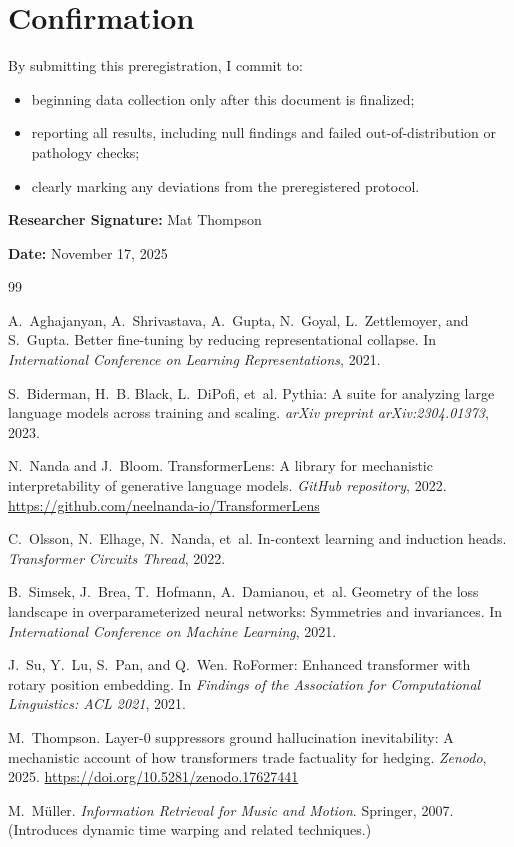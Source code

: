 \documentclass[11pt]{article}
\begin{document}
\section{Confirmation}

By submitting this preregistration, I commit to:
\begin{itemize}
  \item beginning data collection only after this document is finalized;
  \item reporting all results, including null findings and failed out-of-distribution or pathology checks;
  \item clearly marking any deviations from the preregistered protocol.
\end{itemize}

\bigskip

\noindent\textbf{Researcher Signature:} Mat Thompson

\noindent\textbf{Date:} November 17, 2025

\begin{thebibliography}{99}

A.~Aghajanyan, A.~Shrivastava, A.~Gupta, N.~Goyal, L.~Zettlemoyer, and S.~Gupta.
\newblock Better fine-tuning by reducing representational collapse.
\newblock In \emph{International Conference on Learning Representations}, 2021.

S.~Biderman, H.~B. Black, L.~DiPofi, et~al.
\newblock Pythia: A suite for analyzing large language models across training and scaling.
\newblock \emph{arXiv preprint arXiv:2304.01373}, 2023.

N.~Nanda and J.~Bloom.
\newblock TransformerLens: A library for mechanistic interpretability of generative language models.
\newblock \emph{GitHub repository}, 2022. \url{https://github.com/neelnanda-io/TransformerLens}

C.~Olsson, N.~Elhage, N.~Nanda, et~al.
\newblock In-context learning and induction heads.
\newblock \emph{Transformer Circuits Thread}, 2022.

B.~Simsek, J.~Brea, T.~Hofmann, A.~Damianou, et~al.
\newblock Geometry of the loss landscape in overparameterized neural networks: Symmetries and invariances.
\newblock In \emph{International Conference on Machine Learning}, 2021.

J.~Su, Y.~Lu, S.~Pan, and Q.~Wen.
\newblock RoFormer: Enhanced transformer with rotary position embedding.
\newblock In \emph{Findings of the Association for Computational Linguistics: ACL 2021}, 2021.

M.~Thompson.
\newblock Layer-0 suppressors ground hallucination inevitability: A mechanistic account of how transformers trade factuality for hedging.
\newblock \emph{Zenodo}, 2025. \url{https://doi.org/10.5281/zenodo.17627441}

M.~M{\"u}ller.
\newblock \emph{Information Retrieval for Music and Motion}.
\newblock Springer, 2007. (Introduces dynamic time warping and related techniques.)

\end{thebibliography}
\end{document}
